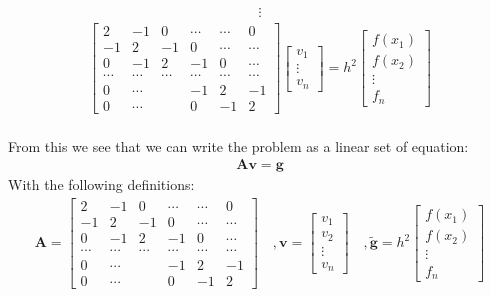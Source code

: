 \documentclass[american,a4paper,12pt]{article}
\renewcommand{\vec}[1]{\mathbf{#1}} %
\begin{document}
    \begin{align*}
      \vdots
    \end{align*}
    \begin{align*}
          \begin{bmatrix}
            2 & -1 & 0 & \cdots & \cdots & 0 \\
            -1 & 2 & -1 & 0 & \cdots & \cdots \\
            0 & -1 & 2 & -1 & 0 & \cdots \\
            \cdots & \cdots & \cdots & \cdots & \cdots & \cdots \\
            0 & \cdots & & -1 & 2 & -1 \\
            0 & \cdots & & 0 & -1 & 2
          \end{bmatrix}
          \begin{bmatrix}
            v_1 \\
            \vdots \\
            v_n
          \end{bmatrix}
    = h^2
          \begin{bmatrix}
            f(x_1) \\
            f(x_2) \\
            \vdots \\
            f_n
          \end{bmatrix}
    \end{align*}
    \\ From this we see that we can write the problem as a linear set of equation:
    \begin{align*}
      \vec{A}\vec{v} = \vec{g}
    \end{align*}
    With the following definitions:\\
    \begin{align*}
      \vec{A} =
      \begin{bmatrix}
        2 & -1 & 0 & \cdots & \cdots & 0 \\
        -1 & 2 & -1 & 0 & \cdots & \cdots \\
        0 & -1 & 2 & -1 & 0 & \cdots \\
        \cdots & \cdots & \cdots & \cdots & \cdots & \cdots \\
        0 & \cdots & & -1 & 2 & -1 \\
        0 & \cdots & & 0 & -1 & 2
      \end{bmatrix}
      \quad, \vec{v} =
      \begin{bmatrix}
        v_1 \\
        v_2 \\
        \vdots \\
        v_n
      \end{bmatrix}
      \quad, \vec{\tilde{g}} = h^2
      \begin{bmatrix}
        f(x_1) \\
        f(x_2) \\
        \vdots \\
        f_n
      \end{bmatrix}
    \end{align*}
\end{document}
